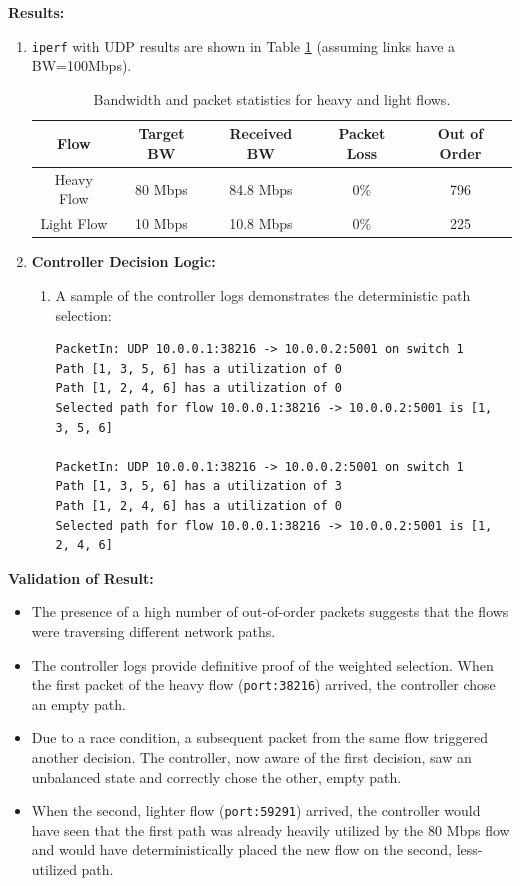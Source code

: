 \documentclass[12pt]{article}
\begin{document}
\noindent \textbf{Results:}
\begin{enumerate}
    \item \texttt{iperf} with UDP results are shown in Table \ref{tab:flow-stats} (assuming links have a BW=100Mbps).
    \begin{table}[h!]
        \centering
        \begin{tabular}{|c|c|c|c|c|}
            \hline
            \textbf{Flow} & \textbf{Target BW} & \textbf{Received BW} & \textbf{Packet Loss} & \textbf{Out of Order} \\
            \hline
            Heavy Flow & 80 Mbps & 84.8 Mbps & 0\% & 796 \\
            Light Flow & 10 Mbps & 10.8 Mbps & 0\% & 225 \\
            \hline
        \end{tabular}
        \caption{Bandwidth and packet statistics for heavy and light flows.}
        \label{tab:flow-stats}
    \end{table}
    \item \textbf{Controller Decision Logic:}
    \begin{enumerate}
        \item A sample of the controller logs demonstrates the deterministic path selection:
        \begin{verbatim}
PacketIn: UDP 10.0.0.1:38216 -> 10.0.0.2:5001 on switch 1
Path [1, 3, 5, 6] has a utilization of 0
Path [1, 2, 4, 6] has a utilization of 0
Selected path for flow 10.0.0.1:38216 -> 10.0.0.2:5001 is [1, 3, 5, 6]

PacketIn: UDP 10.0.0.1:38216 -> 10.0.0.2:5001 on switch 1
Path [1, 3, 5, 6] has a utilization of 3
Path [1, 2, 4, 6] has a utilization of 0
Selected path for flow 10.0.0.1:38216 -> 10.0.0.2:5001 is [1, 2, 4, 6]
        \end{verbatim}
    \end{enumerate}
\end{enumerate}

\noindent \textbf{Validation of Result:}
\begin{itemize}
    \item The presence of a high number of out-of-order packets suggests that the flows were traversing different network paths.
    \item The controller logs provide definitive proof of the weighted selection. When the first packet of the heavy flow (\texttt{port:38216}) arrived, the controller chose an empty path.
    \item Due to a race condition, a subsequent packet from the same flow triggered another decision. The controller, now aware of the first decision, saw an unbalanced state and correctly chose the other, empty path.
    \item When the second, lighter flow (\texttt{port:59291}) arrived, the controller would have seen that the first path was already heavily utilized by the 80 Mbps flow and would have deterministically placed the new flow on the second, less-utilized path.
\end{itemize}
\end{document}
